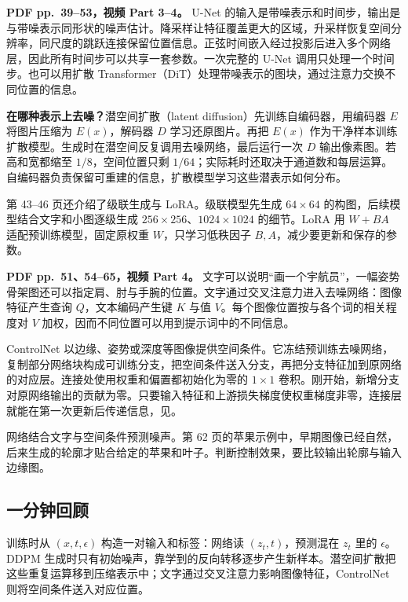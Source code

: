 \textbf{PDF pp.~39--53，视频 Part 3--4。}
U-Net 的输入是带噪表示和时间步，输出是与带噪表示同形状的噪声估计。降采样让特征覆盖更大的区域，升采样恢复空间分辨率，同尺度的跳跃连接保留位置信息。正弦时间嵌入经过投影后进入多个网络层，因此所有时间步可以共享一套参数。一次完整的 U-Net 调用只处理一个时间步。也可以用扩散 Transformer（DiT）处理带噪表示的图块，通过注意力交换不同位置的信息。

\textbf{在哪种表示上去噪？}潜空间扩散（latent diffusion）先训练自编码器，用编码器 $E$ 将图片压缩为 $E(x)$，解码器 $D$ 学习还原图片。再把 $E(x)$ 作为干净样本训练扩散模型。生成时在潜空间反复调用去噪网络，最后运行一次 $D$ 输出像素图。若高和宽都缩至 $1/8$，空间位置只剩 $1/64$；实际耗时还取决于通道数和每层运算。自编码器负责保留可重建的信息，扩散模型学习这些潜表示如何分布。

第 43--46 页还介绍了级联生成与 LoRA。级联模型先生成 $64\times64$ 的构图，后续模型结合文字和小图逐级生成 $256\times256$、$1024\times1024$ 的细节。LoRA 用 $W+BA$ 适配预训练模型，固定原权重 $W$，只学习低秩因子 $B,A$，减少要更新和保存的参数。

\textbf{PDF pp.~51、54--65，视频 Part 4。}
文字可以说明“画一个宇航员”，一幅姿势骨架图还可以指定肩、肘与手腕的位置。文字通过交叉注意力进入去噪网络：图像特征产生查询 $Q$，文本编码产生键 $K$ 与值 $V$。每个图像位置按与各个词的相关程度对 $V$ 加权，因而不同位置可以用到提示词中的不同信息。

ControlNet 以边缘、姿势或深度等图像提供空间条件。它冻结预训练去噪网络，复制部分网络块构成可训练分支，把空间条件送入分支，再把分支特征加到原网络的对应层。连接处使用权重和偏置都初始化为零的 $1\times1$ 卷积。刚开始，新增分支对原网络输出的贡献为零。只要输入特征和上游损失梯度使权重梯度非零，连接层就能在第一次更新后传递信息，见。

网络结合文字与空间条件预测噪声。第 62 页的苹果示例中，早期图像已经自然，后来生成的轮廓才贴合给定的苹果和叶子。判断控制效果，要比较输出轮廓与输入边缘图。

\subsection{一分钟回顾}
训练时从 $(x,t,\epsilon)$ 构造一对输入和标签：网络读 $(z_t,t)$，预测混在 $z_t$ 里的 $\epsilon$。DDPM 生成时只有初始噪声，靠学到的反向转移逐步产生新样本。潜空间扩散把这些重复运算移到压缩表示中；文字通过交叉注意力影响图像特征，ControlNet 则将空间条件送入对应位置。
\endgroup
